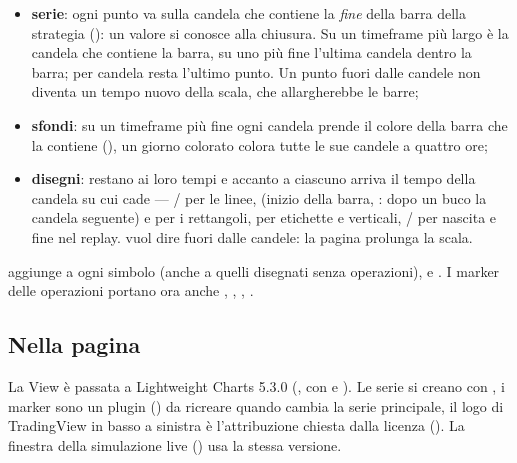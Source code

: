 \begin{itemize}
  \item \textbf{serie}: ogni punto va sulla candela che contiene la
    \emph{fine} della barra della strategia (): un valore
    si conosce alla chiusura. Su un timeframe più largo è la candela che
    contiene la barra, su uno più fine l'ultima candela dentro la barra; per
    candela resta l'ultimo punto. Un punto fuori dalle candele non diventa un
    tempo nuovo della scala, che allargherebbe le barre;
  \item \textbf{sfondi}: su un timeframe più fine ogni candela prende il
    colore della barra che la contiene (),
    un giorno colorato colora tutte le sue candele a quattro ore;
  \item \textbf{disegni}: restano ai loro tempi e accanto a ciascuno arriva
    il tempo della candela su cui cade --- / per le linee,
     (inizio della barra, : dopo un buco
    la candela seguente) e  per i rettangoli,  per etichette
    e verticali, / per nascita e fine nel replay. 
    vuol dire fuori dalle candele: la pagina prolunga la scala.
\end{itemize}

\noindent
{} aggiunge  a ogni
simbolo (anche a quelli disegnati senza operazioni), 
e . I marker delle operazioni portano ora anche
, , , .

\subsection{Nella pagina}

La View è passata a Lightweight Charts 5.3.0
(, con  e
). Le serie si creano con , i marker sono un plugin () da ricreare
quando cambia la serie principale, il logo di TradingView in basso a sinistra
è l'attribuzione chiesta dalla licenza (). La
finestra della simulazione live () usa la stessa
versione.

